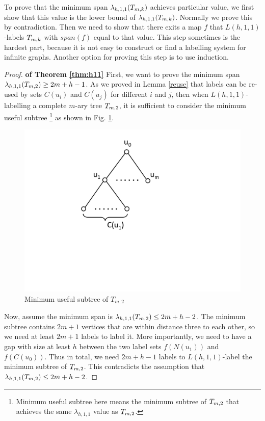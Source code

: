 To prove that the minimum span $\lamh11(\tmk)$ achieves particular value, we first show that this value is the lower bound of $\lamh11(\tmk)$. Normally we prove this by contradiction. Then we need to show that there exits a map $f$ that $L(h,1,1)$-labels $T_{m,k}$ with $span(f)$ equal to that value. This step sometimes is the hardest part, because it is not easy to construct or find a labelling system for infinite graphs. Another option for proving this step is to use induction. 
\\
\begin{proof}{\bf of Theorem \ref{thm:h11}}
First, we want to prove the minimum span $\lamh11(\tm2) \ge 2m+h-1$. As we proved in Lemma \ref{reuse} that labels can be re-used by sets $C(u_i)$ and $C(u_j)$ for different $i$ and $j$, then when $L(h,1,1)$-labelling a complete $m$-ary tree $\tm2$, it is sufficient to consider the minimum useful subtree \footnote{Minimum useful subtree here means the  minimum subtree of $\tm2$ that achieves the same $\lambda_{h,1,1}$ value as $\tm2$.} as shown in Fig. \ref{useful part}. 

\begin{figure}
\centering
      \vspace{-10pt}
    \includegraphics[scale=0.4]{../figures/fig3-2.pdf}
        \vspace{-80pt}
\caption{Minimum useful subtree of $T_{m,2}$}
\label{useful part}
\end{figure}

Now, assume the minimum span is $\lamh11(\tm2) \le 2m+h-2$. The minimum subtree contains $2m+1$ vertices that are within distance three to each other, so we need at least $2m+1$ labels to label it. More importantly, we need to have a gap with size at least $h$ between the two label sets $f(N(u_1))$ and $f(C(u_0))$. Thus in total, we need $2m+h-1$ labels to $L(h,1,1)$-label the minimum subtree of $\tm2$. This contradicts the assumption that $\lamh11(\tm2) \le 2m+h-2$. 


\end{proof}
